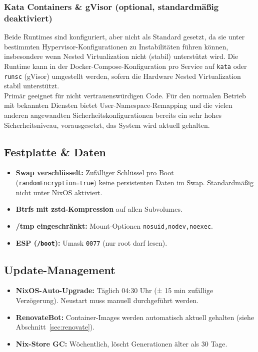 \subsubsection*{Kata Containers \& gVisor (optional, standardmäßig deaktiviert)}
Beide Runtimes sind konfiguriert, aber nicht als Standard gesetzt, da sie unter bestimmten Hypervisor-Konfigurationen zu Instabilitäten führen können, insbesondere wenn Nested Virtualization nicht (stabil) unterstützt wird.
Die Runtime kann in der Docker-Compose-Konfiguration pro Service auf \texttt{kata} oder \texttt{runsc} (gVisor) umgestellt werden, sofern die Hardware Nested Virtualization stabil unterstützt.\\
Primär geeignet für nicht vertrauenswürdigen Code. Für den normalen Betrieb mit bekannten Diensten bietet User-Namespace-Remapping und die vielen anderen angewandten Sicherheitskonfigurationen bereits ein sehr hohes Sicherheitsniveau, vorausgesetzt, das System wird aktuell gehalten.

\subsection{Festplatte \& Daten}
\begin{itemize}
  \item \textbf{Swap verschlüsselt:} Zufälliger Schlüssel pro Boot \\
  (\texttt{randomEncryption=true}) keine persistenten Daten im Swap. Standardmäßig nicht unter NixOS aktiviert.
  \item \textbf{Btrfs mit zstd-Kompression} auf allen Subvolumes.
  \item \textbf{/tmp eingeschränkt:} Mount-Optionen \texttt{nosuid,nodev,noexec}.
  \item \textbf{ESP (\texttt{/boot}):} Umask \texttt{0077} (nur root darf lesen). 
\end{itemize}

\subsection{Update-Management}

\begin{itemize}
  \item \textbf{NixOS-Auto-Upgrade:} Täglich 04:30 Uhr (± 15 min zufällige Verzögerung). Neustart muss manuell durchgeführt werden.
  \item \textbf{RenovateBot:} Container-Images werden automatisch aktuell gehalten (siehe Abschnitt~\ref{sec:renovate}).
  \item \textbf{Nix-Store GC:} Wöchentlich, löscht Generationen älter als 30 Tage.
\end{itemize}